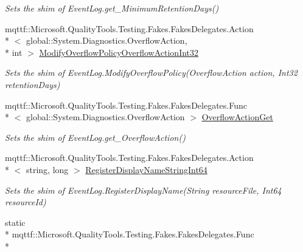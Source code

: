 \begin{DoxyCompactItemize}
\begin{DoxyCompactList}\small\item\em Sets the shim of Event\-Log.\-get\-\_\-\-Minimum\-Retention\-Days()\end{DoxyCompactList}\item 
mqttf\-::\-Microsoft.\-Quality\-Tools.\-Testing.\-Fakes.\-Fakes\-Delegates.\-Action\\*
$<$ global\-::\-System.\-Diagnostics.\-Overflow\-Action, \\*
int $>$ \hyperlink{class_system_1_1_diagnostics_1_1_fakes_1_1_shim_event_log_a81a3d463695d0d2fd2628f4d40dd79eb}{Modify\-Overflow\-Policy\-Overflow\-Action\-Int32}
\begin{DoxyCompactList}\small\item\em Sets the shim of Event\-Log.\-Modify\-Overflow\-Policy(\-Overflow\-Action action, Int32 retention\-Days)\end{DoxyCompactList}\item 
mqttf\-::\-Microsoft.\-Quality\-Tools.\-Testing.\-Fakes.\-Fakes\-Delegates.\-Func\\*
$<$ global\-::\-System.\-Diagnostics.\-Overflow\-Action $>$ \hyperlink{class_system_1_1_diagnostics_1_1_fakes_1_1_shim_event_log_aa4e6d5a8480c067f65e6ed8215ab7122}{Overflow\-Action\-Get}
\begin{DoxyCompactList}\small\item\em Sets the shim of Event\-Log.\-get\-\_\-\-Overflow\-Action()\end{DoxyCompactList}\item 
mqttf\-::\-Microsoft.\-Quality\-Tools.\-Testing.\-Fakes.\-Fakes\-Delegates.\-Action\\*
$<$ string, long $>$ \hyperlink{class_system_1_1_diagnostics_1_1_fakes_1_1_shim_event_log_a4e1aeaea5fa7d6bdb60a73545b6a486e}{Register\-Display\-Name\-String\-Int64}
\begin{DoxyCompactList}\small\item\em Sets the shim of Event\-Log.\-Register\-Display\-Name(\-String resource\-File, Int64 resource\-Id)\end{DoxyCompactList}\item 
static \\*
mqttf\-::\-Microsoft.\-Quality\-Tools.\-Testing.\-Fakes.\-Fakes\-Delegates.\-Func\\*

\end{DoxyCompactItemize}
